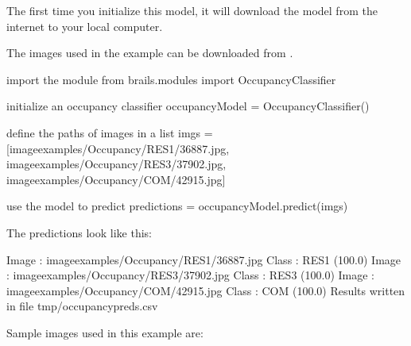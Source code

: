 \documentclass[letterpaper,10pt,english]{sphinxmanual}
\begin{document}
\sphinxAtStartPar
The first time you initialize this model, it will download the model from the internet to your local computer.

\sphinxAtStartPar
The images used in the example can be downloaded from .

\begin{sphinxVerbatim}[commandchars=\\\{\}]
\PYGZsh{} import the module
from brails.modules import OccupancyClassifier

\PYGZsh{} initialize an occupancy classifier
occupancyModel = OccupancyClassifier()

\PYGZsh{} define the paths of images in a list
imgs = [\PYGZsq{}image\PYGZus{}examples/Occupancy/RES1/36887.jpg\PYGZsq{},
    \PYGZsq{}image\PYGZus{}examples/Occupancy/RES3/37902.jpg\PYGZsq{},
    \PYGZsq{}image\PYGZus{}examples/Occupancy/COM/42915.jpg\PYGZsq{}]

\PYGZsh{} use the model to predict
predictions = occupancyModel.predict(imgs)
\end{sphinxVerbatim}

\sphinxAtStartPar
The predictions look like this:

\begin{sphinxVerbatim}[commandchars=\\\{\}]
Image :  image\PYGZus{}examples/Occupancy/RES1/36887.jpg     Class : RES1 (100.0\PYGZpc{})
Image :  image\PYGZus{}examples/Occupancy/RES3/37902.jpg     Class : RES3 (100.0\PYGZpc{})
Image :  image\PYGZus{}examples/Occupancy/COM/42915.jpg     Class : COM (100.0\PYGZpc{})
Results written in file tmp/occupancy\PYGZus{}preds.csv
\end{sphinxVerbatim}

\sphinxAtStartPar
Sample images used in this example are:
\end{document}
